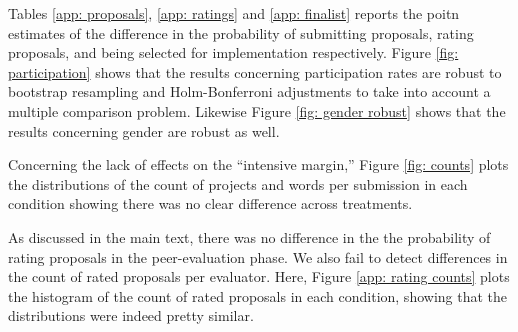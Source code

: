 \documentclass[11pt, titlepage]{article}
\begin{document}
Tables \ref{app: proposals}, \ref{app: ratings} and \ref{app: finalist}
reports the poitn estimates of the difference in the probability of
submitting proposals, rating proposals, and being selected for
implementation respectively. Figure \ref{fig: participation} shows that
the results concerning participation rates are robust to bootstrap
resampling and Holm-Bonferroni adjustments to take into account a
multiple comparison problem. Likewise Figure \ref{fig: gender robust}
shows that the results concerning gender are robust as well.

Concerning the lack of effects on the ``intensive margin,'' Figure
\ref{fig: counts} plots the distributions of the count of projects and
words per submission in each condition showing there was no clear
difference across treatments.

As discussed in the main text, there was no difference in the the
probability of rating proposals in the peer-evaluation phase. We also
fail to detect differences in the count of rated proposals per
evaluator. Here, Figure \ref{app: rating counts} plots the histogram of
the count of rated proposals in each condition, showing that the
distributions were indeed pretty similar.
\end{document}

